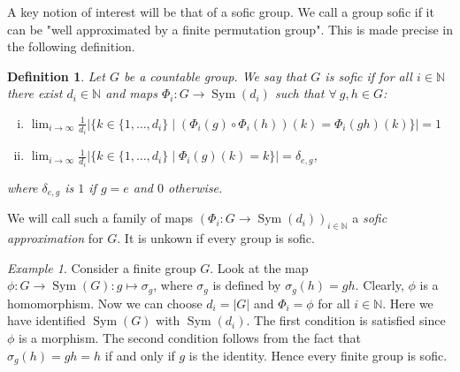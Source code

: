 \documentclass[titlepage, a4paper]{article}
\newcommand{\N}{\mathbb{N}}
\newcommand{\card}[1]{\left| #1 \right|}
\DeclareMathOperator{\sym}{Sym}
\newtheorem{definition}{Definition}
\theoremstyle{remark}
\newtheorem{example}{Example}
\begin{document}
    A key notion of interest will be that of a sofic group. We call a group sofic if it can be "well approximated by a finite permutation group". This is made precise in the following definition.

    \begin{definition}\label{def:Sofic}
        Let $G$ be a countable group. We say that $G$ is sofic if for all $i\in \N$ there exist $d_i \in \N$ and maps $\Phi_i : G \to \sym(d_i)$ such that $\forall\ g, h \in G$:
        \begin{enumerate}[(i)]
            \item $\displaystyle \lim_{i\to \infty} \frac{1}{d_i} \card{\big\{k \in \{1, \dots, d_i\} \mid (\Phi_i(g) \circ \Phi_i(h))(k) = \Phi_i(gh) (k) \big\}} = 1$
            \item $\displaystyle \lim_{i\to \infty} \frac{1}{d_i}  \card{\big\{k \in \{1, \dots, d_i\} \mid \Phi_i(g)(k) = k \big\}} = \delta_{e,g}$,
        \end{enumerate}
        where $\delta_{e,g}$ is $1$ if $g = e$ and $0$ otherwise.
    \end{definition}

    We will call such a family of maps $\left(\Phi_i : G \to \sym(d_i) \right)_{i \in \N}$ a \emph{sofic approximation} for $G$. It is unkown if every group is sofic.

    \begin{example}\label{ex:finite_group_sofic}
    Consider a finite group $G$. Look at the map $\phi: G \to \sym(G): g \mapsto \sigma_g$, where $\sigma_g$ is defined by $\sigma_g(h) = gh$. Clearly, $\phi$ is a homomorphism. Now we can choose $d_i = \card G$ and $\Phi_i = \phi$ for all $i \in \N$. Here we have identified $\sym(G)$ with $\sym(d_i)$. The first condition is satisfied since $\phi$ is a morphism. The second condition follows from the fact that $\sigma_g(h) = gh = h$ if and only if $g$ is the identity.
     Hence every finite group is sofic.
    \end{example}

\end{document}
